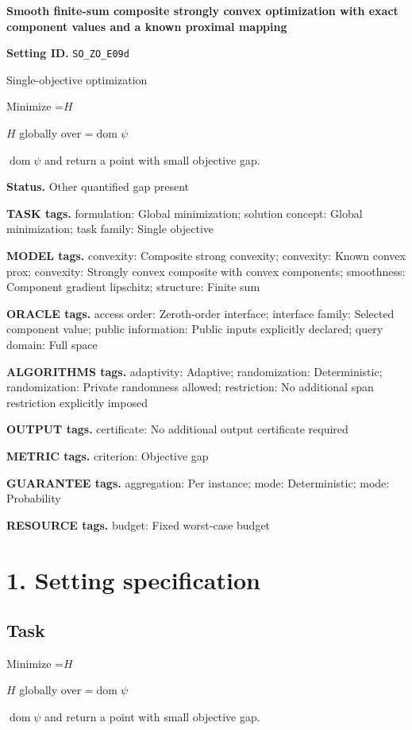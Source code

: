 \documentclass[10pt,a4paper]{article}
\newcommand{\AtlasMath}[1]{\par\begingroup\centering\setbox0=\hbox{$\displaystyle #1$}\ifdim\wd0>1.4\linewidth\typeout{ATLAS WIDE FORMULA: \the\wd0}\fi\ifdim\wd0>\linewidth\resizebox{\linewidth}{!}{\box0}\else\box0\fi\par\endgroup}
\newcommand{\AtlasInlineMath}[1]{\begingroup\setbox0=\hbox{$#1$}\ifdim\wd0>.4\linewidth\endgroup\AtlasMath{#1}\else\endgroup$#1$\fi}
\begin{document}
\raggedright

{\LARGE\bfseries\sffamily\color{AtlasNavy} Smooth finite-sum composite strongly convex optimization with exact component values and a known proximal mapping\par}\vspace{5pt}
\textbf{Setting ID.} \texttt{SO\_\allowbreak{}ZO\_\allowbreak{}E09d}

Single-objective optimization

Minimize \AtlasInlineMath{H} globally over \AtlasInlineMath{\operatorname{dom}\psi} and return a point with small objective gap.

\textbf{Status.} Other quantified gap present

\textbf{TASK tags.} formulation: Global minimization; solution concept: Global minimization; task family: Single objective

\textbf{MODEL tags.} convexity: Composite strong convexity; convexity: Known convex prox; convexity: Strongly convex composite with convex components; smoothness: Component gradient lipschitz; structure: Finite sum

\textbf{ORACLE tags.} access order: Zeroth-order interface; interface family: Selected component value; public information: Public inputs explicitly declared; query domain: Full space

\textbf{ALGORITHMS tags.} adaptivity: Adaptive; randomization: Deterministic; randomization: Private randomness allowed; restriction: No additional span restriction explicitly imposed

\textbf{OUTPUT tags.} certificate: No additional output certificate required

\textbf{METRIC tags.} criterion: Objective gap

\textbf{GUARANTEE tags.} aggregation: Per instance; mode: Deterministic; mode: Probability

\textbf{RESOURCE tags.} budget: Fixed worst-case budget

\section{1. Setting specification}
\subsection{Task}
Minimize \AtlasInlineMath{H} globally over \AtlasInlineMath{\operatorname{dom}\psi} and return a point with small objective gap.
\end{document}
